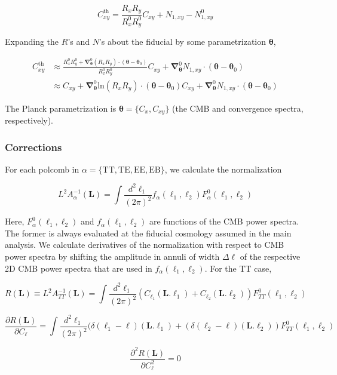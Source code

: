 \documentclass[a4paper, 11pt]{article}
\begin{document}
$$
C_{xy}^{\mathrm{th}}=\frac{R_xR_y}{R^0_xR^0_y}C_{xy} + N_{1,xy} - N_{1,xy}^0
$$

Expanding the $R$'s and $N$'s about the fiducial by some parametrization $\boldsymbol{\theta}$,

\newcommand{\bth}{\boldsymbol{\theta}}
\newcommand{\bna}{\boldsymbol{\nabla}}

\begin{align*}
C_{xy}^{\mathrm{th}}&\approx\frac{R^0_xR^0_y+\bna^0_{\bth} (R_xR_y)\cdot (\bth-\bth_0)}{R^0_xR^0_y}C_{xy} + \bna^0_{\bth} N_{1,xy}\cdot (\bth-\bth_0) \\
&\approx C_{xy}+\bna^0_{\bth} \mathrm{ln}(R_xR_y)\cdot (\bth-\bth_0)C_{xy} + \bna^0_{\bth} N_{1,xy}\cdot (\bth-\bth_0)
\end{align*}

The Planck parametrization is $\bth=\{C_x, C_{xy}\}$ (the CMB and convergence spectra, respectively).

\subsubsection{Corrections}

\newcommand{\bell}{\boldsymbol{\ell}}
\newcommand{\bL}{\boldsymbol{L}}

For each polcomb in $\alpha=\{\mathrm{TT,TE,EE,EB}\}$, we calculate the normalization

$$
L^2A_{\alpha}^{-1}(\bL) = \int \frac{d^2\bell_1}{(2\pi)^2} f_{\alpha}(\bell_1,\bell_2)F_{\alpha}^0(\bell_1,\bell_2)
$$

Here, $F_{\alpha}^0(\bell_1,\bell_2)$ and $f_{\alpha}(\bell_1,\bell_2)$ are functions of the CMB power spectra. The former is always evaluated at the fiducial cosmology assumed in the main analysis. We calculate derivatives of the normalization with respect to CMB power spectra by shifting the amplitude in annuli of width $\Delta \ell$ of the respective 2D CMB power spectra that are used in $f_{\alpha}(\bell_1,\bell_2)$. For the TT case,

$$
R(\bL) \equiv L^2A_{TT}^{-1}(\bL) = \int \frac{d^2\bell_1}{(2\pi)^2} (C_{\ell_1}(\bL.\bell_1)+C_{\ell_2}(\bL.\bell_2))F_{TT}^0(\bell_1,\bell_2)
$$

$$
\frac{\partial R(\bL)}{\partial C_{\ell}} = \int \frac{d^2\bell_1}{(2\pi)^2} (\delta(\ell_1-\ell)(\bL.\bell_1)+(\delta(\ell_2-\ell)(\bL.\bell_2))F_{TT}^0(\bell_1,\bell_2)
$$

$$
\frac{\partial^2 R(\bL)}{\partial C^2_{\ell}} = 0
$$
\end{document}

